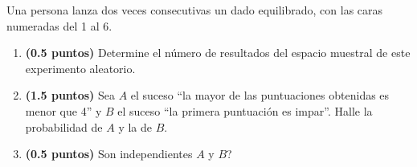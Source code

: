 
Una persona lanza dos veces consecutivas un dado equilibrado, con las caras numeradas del 1 al 6.
\begin{enumerate}[label=\alph*)]
\item \textbf{(0.5 puntos)} Determine el número de resultados del espacio muestral de este experimento aleatorio.
\item \textbf{(1.5 puntos)} Sea $A$ el suceso ``la mayor de las puntuaciones obtenidas es menor que 4'' y $B$ el suceso ``la primera puntuación es impar''. Halle la probabilidad de $A$ y la de $B$.
\item \textbf{(0.5 puntos)} \textquestiondown{}Son independientes $A$ y $B$?
\end{enumerate}
